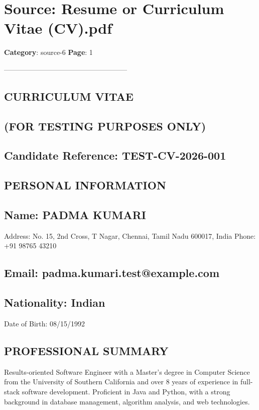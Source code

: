 \section*{Source: Resume or Curriculum Vitae (CV).pdf}
\textbf{Category}: source-6
\textbf{Page}: 1

-----------------------------------------------------

\subsection*{CURRICULUM VITAE}

\subsection*{(FOR TESTING PURPOSES ONLY)}

\subsection*{Candidate Reference: TEST-CV-2026-001}

\subsection*{PERSONAL INFORMATION}

\subsection*{Name: PADMA KUMARI}

Address: No. 15, 2nd Cross, T Nagar, Chennai, Tamil Nadu 600017, India Phone: +91 98765 43210

\subsection*{Email: padma.kumari.test@example.com}

\subsection*{Nationality: Indian}

Date of Birth: 08/15/1992

\subsection*{PROFESSIONAL SUMMARY}

Results-oriented Software Engineer with a Master’s degree in Computer Science from the University of Southern California and over 8 years of experience in full-stack software development. Proficient in Java and Python, with a strong background in database management, algorithm analysis, and web technologies.

